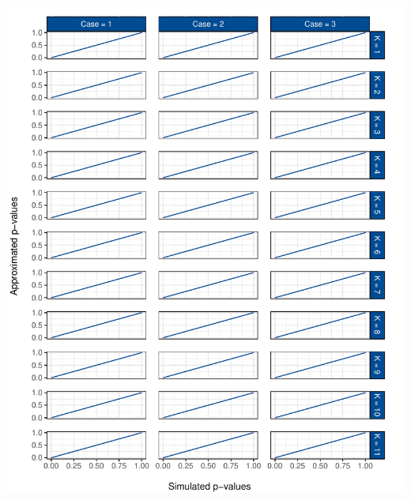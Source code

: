 \documentclass[12pt,a4paper]{article}
\let\origfigure\figure
\let\endorigfigure\endfigure
\renewenvironment{figure}[1][2] {
    \expandafter\origfigure\expandafter[H]
} {
    \endorigfigure
}
\begin{document}
\begin{figure}
\centering
\includegraphics{p_approx_paper_files/figure-latex/approx_sim-all-1.pdf}
\caption{\label{fig:sim_approx_all} Simulated against approximated
\(p\)-values over the whole distribution for all cases and all
underlying tests.}
\end{figure}
\end{document}
